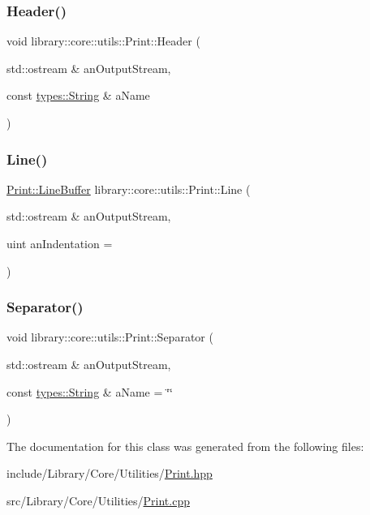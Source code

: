 \subsubsection{\texorpdfstring{Header()}{Header()}}
{\footnotesize\ttfamily void library\+::core\+::utils\+::\+Print\+::\+Header (\begin{DoxyParamCaption}\item[{std\+::ostream \&}]{an\+Output\+Stream,  }\item[{const \mbox{\hyperlink{classlibrary_1_1core_1_1types_1_1_string}{types\+::\+String}} \&}]{a\+Name }\end{DoxyParamCaption})\hspace{0.3cm}{\ttfamily [static]}}

\mbox{\label{classlibrary_1_1core_1_1utils_1_1_print_ab4d98c65fbb58213358df534dd1f6d65}} 
\subsubsection{\texorpdfstring{Line()}{Line()}}
{\footnotesize\ttfamily \mbox{\hyperlink{classlibrary_1_1core_1_1utils_1_1_print_1_1_line_buffer}{Print\+::\+Line\+Buffer}} library\+::core\+::utils\+::\+Print\+::\+Line (\begin{DoxyParamCaption}\item[{std\+::ostream \&}]{an\+Output\+Stream,  }\item[{uint}]{an\+Indentation = {} }\end{DoxyParamCaption})\hspace{0.3cm}{\ttfamily [static]}}

\mbox{\label{classlibrary_1_1core_1_1utils_1_1_print_a2c2f28c75ecbee13ea972f49ea4a3adb}} 
\subsubsection{\texorpdfstring{Separator()}{Separator()}}
{\footnotesize\ttfamily void library\+::core\+::utils\+::\+Print\+::\+Separator (\begin{DoxyParamCaption}\item[{std\+::ostream \&}]{an\+Output\+Stream,  }\item[{const \mbox{\hyperlink{classlibrary_1_1core_1_1types_1_1_string}{types\+::\+String}} \&}]{a\+Name = {\ttfamily \char`\"{}\char`\"{}} }\end{DoxyParamCaption})\hspace{0.3cm}{\ttfamily [static]}}



The documentation for this class was generated from the following files\+:\begin{DoxyCompactItemize}
\item 
include/\+Library/\+Core/\+Utilities/\mbox{\hyperlink{_print_8hpp}{Print.\+hpp}}\item 
src/\+Library/\+Core/\+Utilities/\mbox{\hyperlink{_print_8cpp}{Print.\+cpp}}\end{DoxyCompactItemize}

